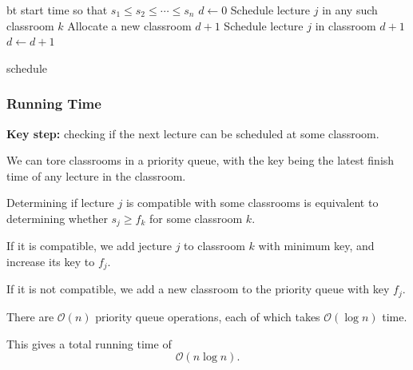 \begin{algorithm}
    \begin{algorithmic}
            \State {} bt start time so that $s_1 \le s_2 \le \cdots \le s_n$
            \State $d \gets 0$
                    \State Schedule lecture $j$ in any such classroom $k$
                \Else
                    \State Allocate a new classroom $d + 1$
                    \State Schedule lecture $j$ in classroom $d + 1$
                    \State $d \gets d + 1$
                \EndIf
            \EndFor

            \State \Return schedule
        \EndFunction
    \end{algorithmic}
\end{algorithm}

\subsubsection{Running Time}

\begin{listu}
    \item \textbf{Key step:} checking if the next lecture can be scheduled at some classroom.

    \item We can tore classrooms in a priority queue, with the key being the latest finish time of any lecture in the classroom.

    \item Determining if lecture $j$ is compatible with some classrooms is equivalent to determining whether $s_j \ge f_k$ for some classroom $k$.

    \begin{listu}
        \item If it is compatible, we add jecture $j$ to classroom $k$ with minimum key, and increase its key to $f_j$.
        \item If it is not compatible, we add a new classroom to the priority queue with key $f_j$.
    \end{listu}

    \item There are $\mathcal{O}(n)$ priority queue operations, each of which takes $\mathcal{O}(\log n)$ time.

    This gives a total running time of \[
        \mathcal{O}(n \log n).
    \]
\end{listu}

